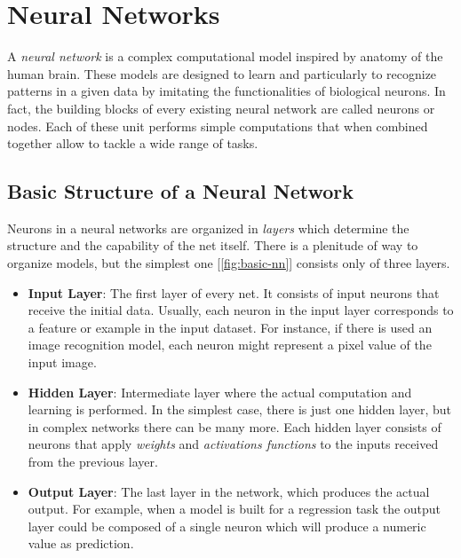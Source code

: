 \documentclass[../Thesis.tex]{subfiles}
\begin{document}
	
	\chapter{Neural Networks}
	\label{sec:neural_networks}
	
	A \emph{neural network} is a complex computational model inspired by anatomy of the human brain. These models are designed to learn and particularly to recognize patterns in a given data by imitating the functionalities of biological neurons. In fact, the building blocks of every existing neural network are called neurons or nodes. Each of these unit performs simple computations that when combined together allow to tackle a wide range of tasks.
	
	\section{Basic Structure of a Neural Network}
	
	Neurons in a neural networks are organized in \emph{layers} which determine the structure and the capability of the net itself. There is a plenitude of way to organize models, but the simplest one [\autoref{fig:basic-nn}] consists only of three layers.
	
	\begin{itemize}
		\item \textbf{Input Layer}: The first layer of every net. It consists of input neurons that receive the initial data. Usually, each neuron in the input layer corresponds to a feature or example in the input dataset. For instance, if there is used an image recognition model, each neuron might represent a pixel value of the input image.
		
		\item \textbf{Hidden Layer}: Intermediate layer where the actual computation and learning is performed. In the simplest case, there is just one hidden layer, but in complex networks there can be many more. Each hidden layer consists of neurons that apply \emph{weights} and \emph{activations functions} to the inputs received from the previous layer.
		
		\item \textbf{Output Layer}: The last layer in the network, which produces the actual output. For example, when a model is built for a regression task the output layer could be composed of a single neuron which will produce a numeric value as prediction.
	\end{itemize}
	
\end{document}
